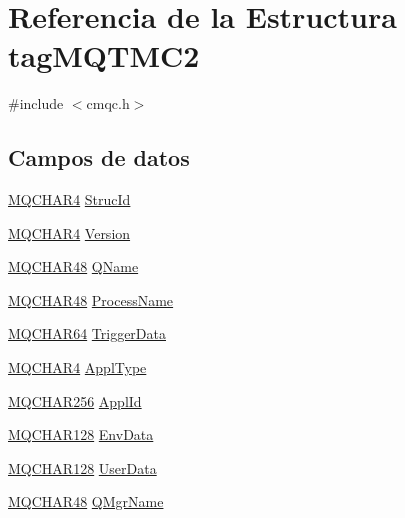 \hypertarget{structtag_m_q_t_m_c2}{}\section{Referencia de la Estructura tag\+M\+Q\+T\+M\+C2}
\label{structtag_m_q_t_m_c2}


{\ttfamily \#include $<$cmqc.\+h$>$}

\subsection*{Campos de datos}
\begin{DoxyCompactItemize}
\item 
\hyperlink{cmqc_8h_a12590e546ed66fda7cf21c1d5cefa31d}{M\+Q\+C\+H\+A\+R4} \hyperlink{structtag_m_q_t_m_c2_a0530922ca944569b52601d74941f96e4}{Struc\+Id}
\item 
\hyperlink{cmqc_8h_a12590e546ed66fda7cf21c1d5cefa31d}{M\+Q\+C\+H\+A\+R4} \hyperlink{structtag_m_q_t_m_c2_ab6f4749c2f2c759dc2c8cf3bd2de5533}{Version}
\item 
\hyperlink{cmqc_8h_a53b1a2836da03f19144836725ff77919}{M\+Q\+C\+H\+A\+R48} \hyperlink{structtag_m_q_t_m_c2_adb95258c4248dc60e3647d2abab48a52}{Q\+Name}
\item 
\hyperlink{cmqc_8h_a53b1a2836da03f19144836725ff77919}{M\+Q\+C\+H\+A\+R48} \hyperlink{structtag_m_q_t_m_c2_a45e2a82a9d94471dd5e7f07d814b4bfb}{Process\+Name}
\item 
\hyperlink{cmqc_8h_a7be9506b7b722fe66291e424a85afa4a}{M\+Q\+C\+H\+A\+R64} \hyperlink{structtag_m_q_t_m_c2_a172805e57851aa511b91533dd357ab99}{Trigger\+Data}
\item 
\hyperlink{cmqc_8h_a12590e546ed66fda7cf21c1d5cefa31d}{M\+Q\+C\+H\+A\+R4} \hyperlink{structtag_m_q_t_m_c2_ad1271c6b9978236d19f8c331815ba410}{Appl\+Type}
\item 
\hyperlink{cmqc_8h_ac492686cf8a90cc3dbc1c48143707ca7}{M\+Q\+C\+H\+A\+R256} \hyperlink{structtag_m_q_t_m_c2_a85937497c4f82d120501b04deb4558a8}{Appl\+Id}
\item 
\hyperlink{cmqc_8h_a7eddcc829f1a614d1a8d2aa5dc2e822d}{M\+Q\+C\+H\+A\+R128} \hyperlink{structtag_m_q_t_m_c2_a852305187782d8464d769e32f9267f12}{Env\+Data}
\item 
\hyperlink{cmqc_8h_a7eddcc829f1a614d1a8d2aa5dc2e822d}{M\+Q\+C\+H\+A\+R128} \hyperlink{structtag_m_q_t_m_c2_a1a68f57af575a62cedaa18c391695747}{User\+Data}
\item 
\hyperlink{cmqc_8h_a53b1a2836da03f19144836725ff77919}{M\+Q\+C\+H\+A\+R48} \hyperlink{structtag_m_q_t_m_c2_a9a487b826b5df3b56f6367613e000b28}{Q\+Mgr\+Name}
\end{DoxyCompactItemize}


